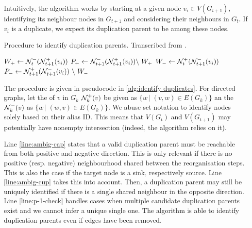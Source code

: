 \documentclass[
	fontsize=10pt, %
	twoside=false, %
	secnumdepth=1, %
  toc=indentunnumbered %
]{kaobook}
\begin{document}
Intuitively, the algorithm works by starting at a given node $v_i \in
V(G_{t+1})$, identifying its neighbour nodes in $G_{t+1}$ and considering their
neighbours in $G_t$. If $v_i$ is a duplicate, we expect its duplication parent
to be among these nodes.

\begin{algorithm}[h]
  \DontPrintSemicolon
  \label{alg:identify-duplicates}
  \caption{ Procedure to identify duplication parents. Transcribed from
    \citeauthor{nielsen_MachineLearningSupport_2019} \cite{nielsen_MachineLearningSupport_2019}.
  }
     $W_+ \gets \mathcal{N}_t^- ( \mathcal{N}_{t+1}^+(v_i) )$ \; $P_+ \gets
  \mathcal{N}_{t+1}^- ( \mathcal{N}_{t+1}^+(v_i) ) \backslash~ W_+$ \; $W_- \gets
  \mathcal{N}_t^+ ( \mathcal{N}_{t+1}^-(v_i) ) $ \; $P_- \gets \mathcal{N}_{t+1}^+ (
  \mathcal{N}_{t+1}^-(v_i) ) ~\backslash~ W_- $\;
\end{algorithm}

The procedure is given in pseudocode in \ref{alg:identify-duplicates}. For
directed graphs, let the  of $v$ in $G_k$
$\mathcal{N}_k^+(v)$ be given as $\{w ~|~ (v,w) \in E(G_{k})\}$ an the  $\mathcal{N}_k^-(v)$ as $\{w ~|~ (w,v) \in E(G_k)\}$. We abuse set
notation to identify nodes solely based on their alias ID. This means that
$V(G_t)$ and $V(G_{t+1})$ may potentially have nonempty intersection (indeed,
the algorithm relies on it).

Line \ref{line:ambig-cap} states that a valid duplication parent must be
reachable from both positive and negative direction. This is only relevant if
there is no positive (resp. negative) neighbourhood shared between the
reorganisation steps. This is also the case if the target node is a sink, 
respectively source. Line \ref{line:ambig-cup} takes this into account. Then, a
duplication parent may still be uniquely identified if there is a single shared
neighbour in the opposite direction.
Line \ref{line:p-1-check} handles cases when multiple candidate duplication
parents exist and we cannot infer a unique single one.
The algorithm is able to identify duplication parents even if edges have been
removed.
\end{document}
